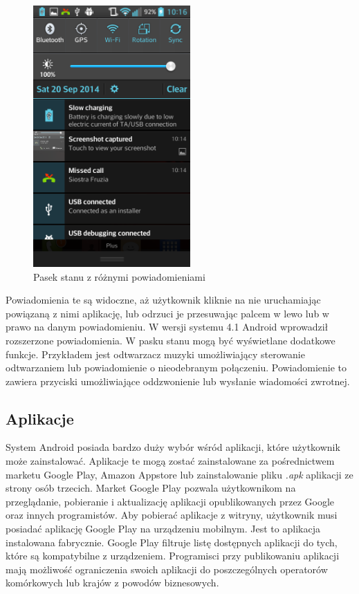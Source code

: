 \begin{figure}[H] 
\centering\includegraphics[width=6cm]{figures/android/statusbar}
\caption{Pasek stanu z różnymi powiadomieniami}
\end{figure}

Powiadomienia te są widoczne, aż użytkownik kliknie na nie uruchamiając powiązaną z nimi aplikację, lub odrzuci je przesuwając palcem w lewo lub w prawo na danym powiadomieniu. W wersji systemu 4.1 Android wprowadził rozszerzone powiadomienia. W pasku stanu mogą być wyświetlane dodatkowe funkcje. Przykładem jest odtwarzacz muzyki umożliwiający sterowanie odtwarzaniem lub powiadomienie o nieodebranym połączeniu. Powiadomienie to zawiera przyciski umożliwiające oddzwonienie lub wysłanie wiadomości zwrotnej.\cite{android:31}

\subsection{Aplikacje}

System Android posiada bardzo duży wybór wśród aplikacji, które użytkownik może zainstalować. Aplikacje te mogą zostać zainstalowane za pośrednictwem marketu Google Play, Amazon Appstore lub zainstalowanie pliku \emph{.apk} aplikacji ze strony osób trzecich.\cite{android:32} Market Google Play pozwala użytkownikom na przeglądanie, pobieranie i aktualizację aplikacji opublikowanych przez Google oraz innych programistów. Aby pobierać aplikacje z witryny, użytkownik musi posiadać aplikację Google Play na urządzeniu mobilnym. Jest to aplikacja instalowana fabrycznie. Google Play filtruje listę dostępnych aplikacji do tych, które są kompatybilne z urządzeniem. Programisci przy publikowaniu aplikacji mają możliwość ograniczenia swoich aplikacji do poszczególnych operatorów komórkowych lub krajów z powodów biznesowych.\cite{android:33}

